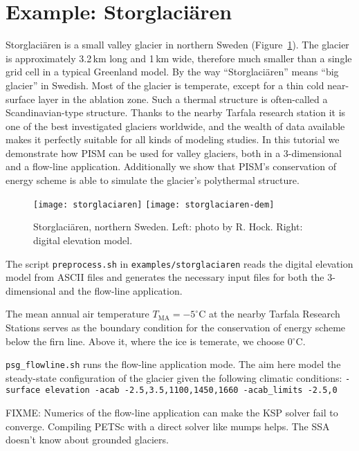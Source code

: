 
\section{Example: Storglaci{\"a}ren}\label{sec:storglaciaren} 

Storglaci{\"a}ren is a small valley glacier in northern Sweden (Figure~\ref{fig:storglaciaren}). The glacier is approximately 3.2\,km long and 1\,km wide, therefore much smaller than a single grid cell in a typical Greenland model. By the way ``Storglaci{\"a}ren'' means ``big glacier'' in Swedish. Most of the glacier is temperate, except for a thin cold near-surface layer in the ablation zone. Such a thermal structure is often-called a Scandinavian-type structure. Thanks to the nearby Tarfala research station it is one of the best investigated glaciers worldwide, and the wealth of data available makes it perfectly suitable for all kinds of modeling studies. In this tutorial we demonstrate how PISM can be used for valley glaciers, both in a 3-dimensional and a flow-line application. Additionally we show that PISM's conservation of energy scheme is able to simulate the glacier's polythermal structure.

\begin{figure}[ht]
  \centering
  \texttt{[image: storglaciaren]}\qquad
  \texttt{[image: storglaciaren-dem]}
  \caption{Storglaci{\"a}ren, northern Sweden. Left: photo by R. Hock. Right: digital elevation model.}
  \label{fig:storglaciaren}
\end{figure}

The script \texttt{preprocess.sh} in \texttt{examples/storglaciaren} reads the digital elevation model from ASCII files and generates the necessary input files for both the 3-dimensional and the flow-line application. 

The mean annual air temperature $T_{\mathrm{MA}}=-5^{\circ}$C at the nearby Tarfala Research Stations serves as the boundary condition for the conservation of energy scheme below the firn line. Above it, where the ice is temerate, we choose 0$^{\circ}$C. 



\texttt{psg_flowline.sh} runs the flow-line application mode. The aim here model the steady-state configuration of the glacier given the following climatic conditions: \texttt{-surface elevation -acab -2.5,3.5,1100,1450,1660 -acab_limits -2.5,0}


FIXME: Numerics of the flow-line application can make the KSP solver fail to converge. Compiling PETSc with a direct solver like mumps helps. The SSA doesn't know about grounded glaciers.